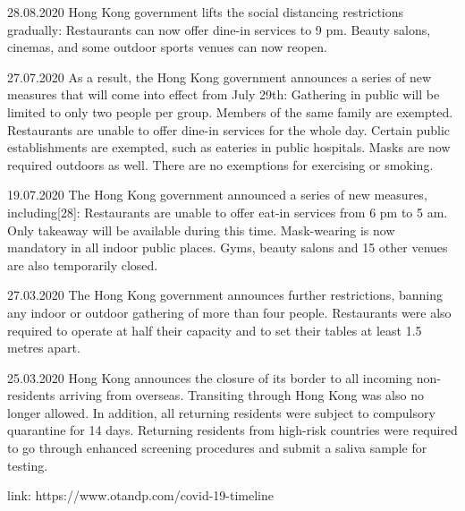 28.08.2020 Hong Kong government lifts the social distancing restrictions gradually:
Restaurants can now offer dine-in services to 9 pm.
Beauty salons, cinemas, and some outdoor sports venues can now reopen.

27.07.2020 As a result, the Hong Kong government announces a series of new measures that will come into effect from July 29th:
Gathering in public will be limited to only two people per group. Members of the same family are exempted.
Restaurants are unable to offer dine-in services for the whole day. Certain public establishments are exempted, such as eateries in public hospitals.
Masks are now required outdoors as well. There are no exemptions for exercising or smoking.

19.07.2020 The Hong Kong government announced a series of new measures, including[28]:
Restaurants are unable to offer eat-in services from 6 pm to 5 am. Only takeaway will be available during this time. Mask-wearing is now mandatory in all indoor public places.
Gyms, beauty salons and 15 other venues are also temporarily closed.

27.03.2020 The Hong Kong government announces further restrictions, banning any indoor or outdoor gathering of more than four people. Restaurants were also required to operate at half their capacity and to set their tables at least 1.5 metres apart.

25.03.2020 Hong Kong announces the closure of its border to all incoming non-residents arriving from overseas. Transiting through Hong Kong was also no longer allowed. In addition, all returning residents were subject to compulsory quarantine for 14 days. Returning residents from high-risk countries were required to go through enhanced screening procedures and submit a saliva sample for testing.

link: https://www.otandp.com/covid-19-timeline











